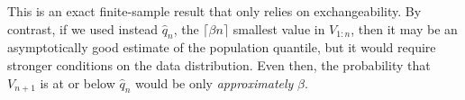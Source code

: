 \documentclass[10.5pt, letterpaper]{article}
\numberwithin{table}{section}
\numberwithin{figure}{section}
\numberwithin{equation}{section}
\begin{document}
This is an exact finite-sample result that only relies on exchangeability. By contrast, if we used instead $\hat q_n$, the $\lceil \beta n \rceil$ smallest value in $V_{1{:}n}$, then it may be an asymptotically good estimate of the population quantile, but it would require stronger conditions on the data distribution. Even then, the probability that $V_{n+1}$ is at or below $\hat q_n$ would be only \emph{approximately} $\beta$.




%
%
%
%
\end{document}
